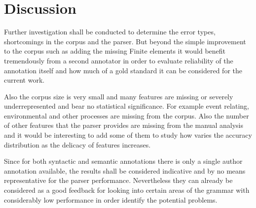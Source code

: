 \section{Discussion}
\label{sec:evaluation-discussion}
Further investigation shall be conducted to determine the error types, shortcomings in the corpus and the parser. But beyond the simple improvement to the corpus such as adding the missing Finite elements it would benefit tremendously from a second annotator in order to evaluate reliability of the annotation itself and how much of a gold standard it can be considered for the current work. 

Also the corpus size is very small and many features are missing or severely underrepresented and bear no statistical significance. For example event relating, environmental and other processes are missing from the corpus. Also the number of other features that the parser provides are missing from the manual analysis and it would be interesting to add some of them to study how varies the accuracy distribution as the delicacy of features increases. 

Since for both syntactic and semantic annotations there is only a single author annotation available, the results shall be considered indicative and by no means representative for the parser performance. Nevertheless they can already be considered as a good feedback for looking into certain areas of the grammar with considerably low performance in order identify the potential problems. 





